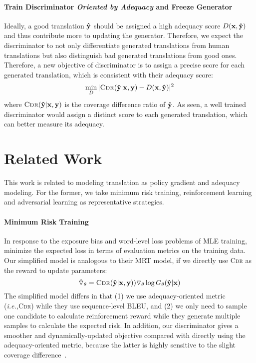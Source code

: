 \documentclass[letterpaper]{article} \usepackage{aaai19}  \usepackage{times}  \usepackage{helvet}  \usepackage{courier}  \usepackage{url}  \usepackage{graphicx}  \frenchspacing  \setlength{\pdfpagewidth}{8.5in}  \setlength{\pdfpageheight}{11in}  \usepackage{amsmath}
\begin{document}
\paragraph{Train Discriminator {\em Oriented by Adequacy} and Freeze Generator}
Ideally, a good translation ${\bf \hat{y}}$ should be assigned a high adequacy score $D({\bf x},{\bf \hat{y}})$ and thus contribute more to updating the generator.
Therefore, we expect the discriminator to not only differentiate generated translations from human translations but also distinguish bad generated translations from good ones. 
Therefore, a new objective of discriminator is to assign a precise score for each generated translation, which is consistent with their adequacy score:
\begin{equation}
  \min_{D}|\textsc{Cdr}({\bf \hat{y}}|{\bf x}, {\bf y}) - D({\bf x}, {\bf \hat{y}})|^{2}
\end{equation}
where $\textsc{Cdr}({\bf \hat{y}}|{\bf x}, {\bf y})$ is the coverage difference ratio of ${\bf \hat{y}}$. As seen, a well trained discriminator would assign a distinct score to each generated translation, which can better measure its adequacy.
\section{Related Work}



This work is related to modeling translation as policy gradient and adequacy modeling. For the former, we take minimum risk training, reinforcement learning and adversarial learning as representative strategies. 


\paragraph{Minimum Risk Training}
In response to the exposure bias and word-level loss problems of MLE training,~\citeauthor{Shen:2016:ACL}~ minimize the expected loss in terms of evaluation metrics on the training data. 
Our simplified model is analogous to their MRT model, if we directly use \textsc{Cdr} as the reward to update parameters:
\begin{equation}
   {\hat{\triangledown}_{\theta}} = \textsc{Cdr}({\bf \hat{y}}|{\bf x},{\bf {y}})){\triangledown_{{\theta}}} \log G_{\theta}({\bf \hat{y}}|{\bf x}) \end{equation}
The simplified model differs in that (1) we use adequacy-oriented metric (\emph{i.e.,}\xspace \textsc{Cdr}) while they use sequence-level BLEU, and (2) we only need to sample one candidate to calculate reinforcement reward while they generate multiple samples to calculate the expected risk.
In addition, our discriminator gives a smoother and dynamically-updated objective compared with directly using the adequacy-oriented metric, because the latter is highly sensitive to the slight coverage difference~\cite{koehn2017six}. 
\end{document}
